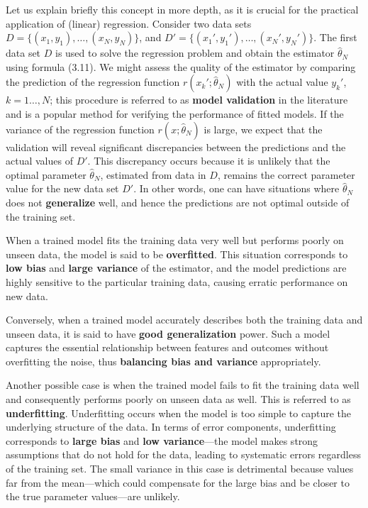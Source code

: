 \documentclass{report}
\begin{document}
Let us explain briefly this concept in more depth, as it is crucial for the practical application of (linear) regression. Consider two data sets $D = \{(x_1,y_1),\dots,(x_N,y_N)\}$, and $D' = \{(x_1',y_1'),\dots,(x_N',y_N')\}$. The first data set $D$ is used to solve the regression problem and obtain the estimator $\hat{\theta}_N$ using formula (3.11). We might assess the quality of the estimator by comparing the prediction of the regression function $r(x_k';\hat{\theta}_N)$ with the actual value $y_k'$, $k = 1\dots,N$; this procedure is referred to as \textbf{model validation} in the literature and is a popular method for verifying the performance of fitted models. If the variance of the regression function $r(x;\hat{\theta}_N)$ is large, we expect that the validation will reveal significant discrepancies between the predictions and the actual values of $D'$. This discrepancy occurs because it is unlikely that the optimal parameter $\hat{\theta}_N$, estimated from data in $D$, remains the correct parameter value for the new data set $D'$. In other words, one can have situations where $\hat{\theta}_N$ does not \textbf{generalize} well, and hence the predictions are not optimal outside of the training set.

When a trained model fits the training data very well but performs poorly on unseen data, the model is said to be \textbf{overfitted}. This situation corresponds to \textbf{low bias} and \textbf{large variance} of the estimator, and the model predictions are highly sensitive to the particular training data, causing erratic performance on new data.

Conversely, when a trained model accurately describes both the training data and unseen data, it is said to have \textbf{good generalization} power. Such a model captures the essential relationship between features and outcomes without overfitting the noise, thus \textbf{balancing bias and variance} appropriately.

Another possible case is when the trained model fails to fit the training data well and consequently performs poorly on unseen data as well. This is referred to as \textbf{underfitting}. Underfitting occurs when the model is too simple to capture the underlying structure of the data. In terms of error components, underfitting corresponds to \textbf{large bias} and \textbf{low variance}—the model makes strong assumptions that do not hold for the data, leading to systematic errors regardless of the training set. The small variance in this case is detrimental because values far from the mean—which could compensate for the large bias and be closer to the true parameter values—are unlikely.
\end{document}
